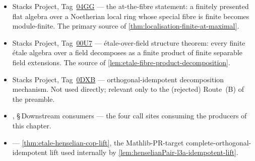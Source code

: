 \begin{itemize}
\item Stacks Project, Tag~\href{https://stacks.math.columbia.edu/tag/04GG}{04GG} —
  the at-the-fibre statement: a finitely presented flat algebra
  over a Noetherian local ring whose special fibre is finite
  becomes module-finite. The primary source of
  \cref{thm:localisation-finite-at-maximal}.
\item Stacks Project, Tag~\href{https://stacks.math.columbia.edu/tag/00U7}{00U7} —
  étale-over-field structure theorem: every finite étale algebra
  over a field decomposes as a finite product of finite separable
  field extensions. The source of
  \cref{lem:etale-fibre-product-decomposition}.
\item Stacks Project, Tag~\href{https://stacks.math.columbia.edu/tag/0DXB}{0DXB} —
  orthogonal-idempotent decomposition mechanism. Not used
  directly; relevant only to the (rejected) Route~(B) of the
  preamble.
\item {},
  \S\,Downstream consumers — the four call sites consuming the
  producers of this chapter.
\item {}
  — \cref{thm:etale-henselian-cop-lift}, the Mathlib-PR-target
  complete-orthogonal-idempotent lift used internally by
  \cref{lem:henselianPair-l3a-idempotent-lift}.
\end{itemize}
